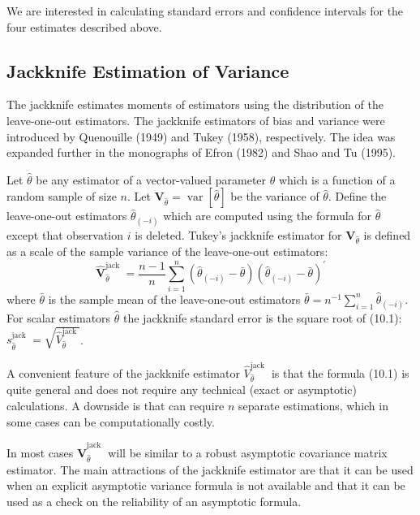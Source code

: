 \documentclass[10pt]{article}
\begin{document}
We are interested in calculating standard errors and confidence intervals for the four estimates described above.

\subsection{Jackknife Estimation of Variance}
The jackknife estimates moments of estimators using the distribution of the leave-one-out estimators. The jackknife estimators of bias and variance were introduced by Quenouille (1949) and Tukey (1958), respectively. The idea was expanded further in the monographs of Efron (1982) and Shao and Tu (1995).

Let $\widehat{\theta}$ be any estimator of a vector-valued parameter $\theta$ which is a function of a random sample of size $n$. Let $\boldsymbol{V}_{\widehat{\theta}}=\operatorname{var}[\widehat{\theta}]$ be the variance of $\widehat{\theta}$. Define the leave-one-out estimators $\widehat{\theta}_{(-i)}$ which are computed using the formula for $\widehat{\theta}$ except that observation $i$ is deleted. Tukey's jackknife estimator for $\boldsymbol{V}_{\widehat{\theta}}$ is defined as a scale of the sample variance of the leave-one-out estimators:
$$
\widehat{\boldsymbol{V}}_{\widehat{\theta}}^{\text {jack }}=\frac{n-1}{n} \sum_{i=1}^{n}\left(\widehat{\theta}_{(-i)}-\bar{\theta}\right)\left(\widehat{\theta}_{(-i)}-\bar{\theta}\right)^{\prime}
$$
where $\bar{\theta}$ is the sample mean of the leave-one-out estimators $\bar{\theta}=n^{-1} \sum_{i=1}^{n} \widehat{\theta}_{(-i)}$. For scalar estimators $\widehat{\theta}$ the jackknife standard error is the square root of (10.1): $s_{\widehat{\theta}}^{\text {jack }}=\sqrt{\widehat{V}_{\widehat{\theta}}^{\text {jack }}}$.

A convenient feature of the jackknife estimator $\widehat{V}_{\widehat{\theta}}^{\text {jack }}$ is that the formula (10.1) is quite general and does not require any technical (exact or asymptotic) calculations. A downside is that can require $n$ separate estimations, which in some cases can be computationally costly.

In most cases $\widehat{\boldsymbol{V}}_{\widehat{\theta}}^{\text {jack }}$ will be similar to a robust asymptotic covariance matrix estimator. The main attractions of the jackknife estimator are that it can be used when an explicit asymptotic variance formula is not available and that it can be used as a check on the reliability of an asymptotic formula.
\end{document}
